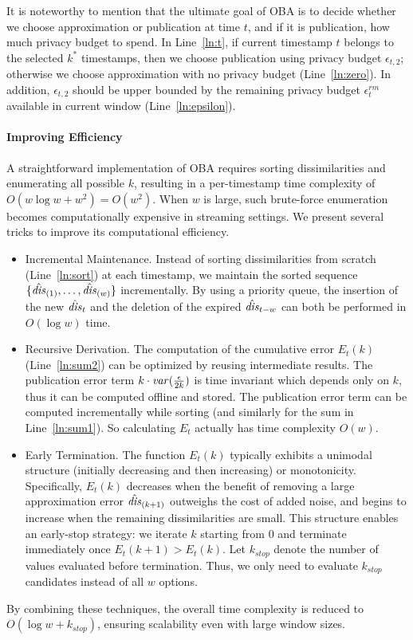 

It is noteworthy to mention that the ultimate goal of OBA is to decide whether
we choose approximation or publication at time $t$, and if it is publication,
how much privacy budget to spend.
In Line~\ref{ln:t}, if current timestamp $t$ belongs to the selected $k^*$
timestamps, then we choose publication using privacy budget $\epsilon_{t,2}$;
otherwise we choose approximation with no privacy budget (Line~\ref{ln:zero}).
In addition, $\epsilon_{t,2}$ should be upper bounded by the remaining privacy
budget $\epsilon_t^\mathit{rm}$ available in current window
(Line~\ref{ln:epsilon}).

\paragraph{Improving Efficiency}
A straightforward implementation of OBA requires sorting dissimilarities and enumerating all possible $k$, resulting in a per-timestamp time complexity of $O(w\log w + w^2) =
O(w^2)$.
When $w$ is large, such brute-force enumeration becomes computationally
expensive in streaming settings.
We present several tricks to improve its computational efficiency.
\begin{itemize}
\item{Incremental Maintenance.} 
 Instead of sorting dissimilarities from scratch (Line~\ref{ln:sort}) at each timestamp, we maintain the sorted sequence $\{\hat{\mathit{dis}}_{(1)}, \dots, \hat{\mathit{dis}}_{(w)}\}$ incrementally.
 By using a priority queue, the insertion of the new $\hat{\mathit{dis}}_t$ and the deletion of the expired $\hat{\mathit{dis}}_{t-w}$ can both be performed in $O(\log w)$ time.
\item{Recursive Derivation.} The computation of the cumulative error $E_t(k)$ (Line~\ref{ln:sum2}) can be optimized by reusing intermediate results.
The publication error term $k\cdot\mathit{var}(\frac{\epsilon}{2k})$ is time
  invariant which depends only on $k$, thus it can be computed offline and stored.
  The publication error term can be computed incrementally while sorting (and similarly for the sum in Line~\ref{ln:sum1}).
  So calculating $E_t$ actually has time complexity $O(w)$.
\item{Early Termination.}
    The function $E_t(k)$ typically exhibits a unimodal structure (initially decreasing and then increasing) or monotonicity.
    Specifically, $E_t(k)$ decreases when the benefit of removing a large approximation error $\hat{\mathit{dis}}_{(k+1)}$ outweighs the cost of added noise, and begins to increase when the remaining dissimilarities are small.
    This structure enables an early-stop strategy: we iterate $k$ starting from $0$ and terminate immediately once $E_t(k+1) > E_t(k)$. Let $k_{\mathit{stop}}$ denote the number of values evaluated before termination.
    Thus, we only need to evaluate $k_{\mathit{stop}}$ candidates instead of all $w$ options.
\end{itemize}
By combining these techniques, the overall time complexity is reduced to $O(\log w + k_{\mathit{stop}})$, ensuring scalability even with large window sizes.